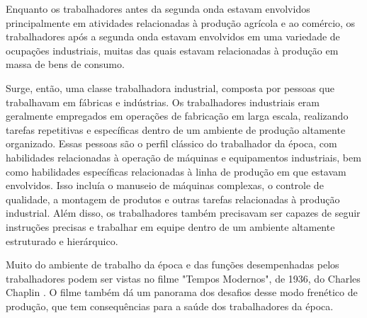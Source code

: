 Enquanto os trabalhadores antes da segunda onda estavam envolvidos principalmente em atividades relacionadas à produção agrícola e ao comércio, os trabalhadores após a segunda onda estavam envolvidos em uma variedade de ocupações industriais, muitas das quais estavam relacionadas à produção em massa de bens de consumo.

Surge, então, uma classe trabalhadora industrial, composta por pessoas que trabalhavam em fábricas e indústrias. Os trabalhadores industriais eram geralmente empregados em operações de fabricação em larga escala, realizando tarefas repetitivas e específicas dentro de um ambiente de produção altamente organizado. Essas pessoas são o perfil clássico do trabalhador da época, com habilidades relacionadas à operação de máquinas e equipamentos industriais, bem como habilidades específicas relacionadas à linha de produção em que estavam envolvidos. Isso incluía o manuseio de máquinas complexas, o controle de qualidade, a montagem de produtos e outras tarefas relacionadas à produção industrial. Além disso, os trabalhadores também precisavam ser capazes de seguir instruções precisas e trabalhar em equipe dentro de um ambiente altamente estruturado e hierárquico.

Muito do ambiente de trabalho da época e das funções desempenhadas pelos trabalhadores podem ser vistas no filme "Tempos Modernos", de 1936, do Charles Chaplin \cite{Chaplin1936}. O filme também dá um panorama dos desafios desse modo frenético de produção, que tem consequências para a saúde dos trabalhadores da época.